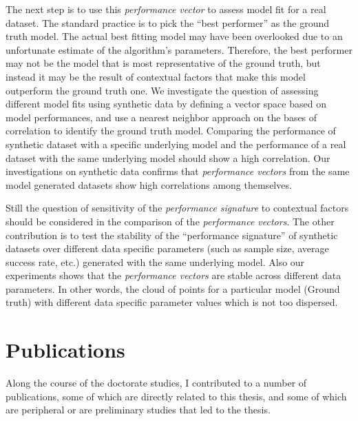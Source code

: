 The next step is to use this \textit{performance vector} to assess model fit for a real dataset. The standard practice is to pick the ``best performer'' as the ground truth model. The actual best fitting model may have been overlooked due to an unfortunate estimate of the algorithm's parameters. Therefore, the best performer may not be the model that is most representative of the ground truth, but instead it may be the result of contextual factors that make this model outperform the ground truth one. We investigate the question of assessing different model fits using synthetic data by defining a vector space based on model performances, and use a nearest neighbor approach on the bases of correlation to identify the ground truth model. Comparing the performance of synthetic dataset with a specific underlying model and the performance of a real dataset with the same underlying model should show a high correlation. Our investigations on synthetic data confirms that \textit{performance vectors} from the same model generated datasets show high correlations among themselves. 

Still the question of sensitivity of the \textit{performance signature} to contextual factors should be considered in the comparison of the \textit{performance vectors}. The other contribution is to test the stability of the ``performance signature'' of synthetic datasets over different data specific parameters (such as sample size, average success rate, etc.) generated with the same underlying model. Also our experiments shows that the \textit{performance vectors} are stable across different data parameters. In other words, the cloud of points for a particular model (Ground truth) with different data specific parameter values which is not too dispersed.


\section{Publications}

Along the course of the doctorate studies, I contributed to a number of publications, some of which are directly related to this thesis, and some of which are peripheral or are preliminary studies that led to the thesis.

